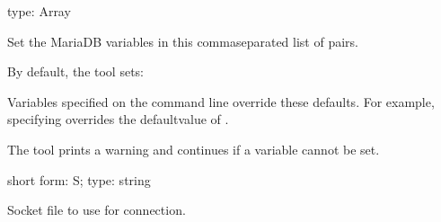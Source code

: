\documentclass[letterpaper,10pt,english]{sphinxmanual}
\begin{document}
\begin{fulllineitems}
\label{\detokenize{mariadb-index-checker:cmdoption-mariadb-index-checker-set-vars}}
type: Array

Set the MariaDB variables in this comma\sphinxhyphen{}separated list of  pairs.

By default, the tool sets:

\begin{sphinxVerbatim}[commandchars=\\\{\}]
\end{sphinxVerbatim}

Variables specified on the command line override these defaults.  For
example, specifying  overrides the defaultvalue of .

The tool prints a warning and continues if a variable cannot be set.

\end{fulllineitems}


\begin{fulllineitems}
\label{\detokenize{mariadb-index-checker:cmdoption-mariadb-index-checker-socket}}
short form: \sphinxhyphen{}S; type: string

Socket file to use for connection.

\end{fulllineitems}

\end{document}
